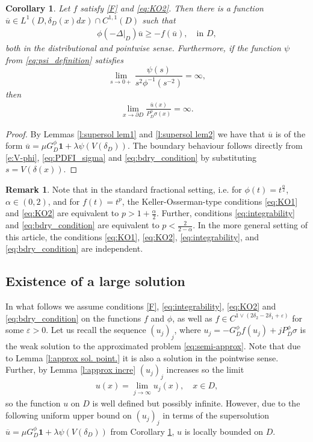 \documentclass[12pt,a4paper,onecolumn]{amsart}
\newtheorem{cor}[thm]{Corollary}
\theoremstyle{definition}
\newtheorem{rem}[thm]{Remark}
\newcommand{\1}{\mathbf 1}
\newcommand{\LLL}{L^1(D,\de(x)dx)}
\newcommand{\Lo}{\phi(-\left.\Delta\right\vert_{D})}
\newcommand{\GDfi}{G^\phi_{ D}}
\newcommand{\GDFI}{\GDfi}
\newcommand{\PDfi}{P^\phi_{ D}}
\newcommand{\PDFI}{\PDfi}
\newcommand{\de}{\delta_D}
\numberwithin{equation}{section}
\begin{document}
\begin{cor}\label{c:large supersolution}
	Let $f$ satisfy \ref{F} and \eqref{eq:KO2}. Then there is a function $\overline u\in \LLL \cap C^{1,1}(D)$ such that 
	\begin{align*}
		\Lo\overline u\ge -f(\overline u),\quad \text{in $D$},
	\end{align*}
	both in the distributional and pointwise sense. Furthermore, if the function $\psi$ from \eqref{eq:psi_definition} satisfies
 \begin{equation}\label{eq:bdry_condition}
 \lim_{s\to 0+}\frac{\psi(s)}{s^2\phi^{-1}(s^{-2})}=\infty,
 \end{equation}
  then 
	\begin{align*}
		\lim_{x\to \partial D}\frac{\overline u(x)}{\PDFI\sigma(x)}=\infty.
	\end{align*}
\end{cor}
\begin{proof}
    By Lemmas \ref{l:supersol lem1} and \ref{l:supersol lem2} we have that $\overline u$ is of the form $\overline u=\mu \GDFI\1+\lambda \psi(V(\de))$.
    The boundary behaviour follows directly from  \eqref{e:V-phi}, \eqref{eq:PDFI_sigma} and \eqref{eq:bdry_condition} by substituting $s=V(\delta(x))$.  
\end{proof}
\begin{rem}
 Note that in the standard fractional setting, i.e. for $\phi(t)=t^{\frac \alpha 2}$, $\alpha\in(0,2)$, and for $f(t)=t^p$, the Keller-Osserman-type conditions \eqref{eq:KO1} and \eqref{eq:KO2} are equivalent to $p>1+\tfrac \alpha 2$. Further, conditions \eqref{eq:integrability} and \eqref{eq:bdry_condition} are equivalent to $p<\tfrac 2{2-\alpha}$. In the more general setting of this article, the conditions \eqref{eq:KO1}, \eqref{eq:KO2}, \eqref{eq:integrability}, and \eqref{eq:bdry_condition} are independent.
\end{rem}


\subsection{Existence of a large solution}\label{ss:existence}
 In what follows we assume conditions \ref{F}, \eqref{eq:integrability}, \eqref{eq:KO2} and \eqref{eq:bdry_condition} on the functions $f$ and $\phi$, as well as $f\in C^{1 \vee (2\delta_2-2\delta_1+\varepsilon)}$ for some $\varepsilon>0$. Let us recall the sequence $(u_j)_j$, where $u_j=-\GDFI f(u_j)+j\PDFI\sigma$ is the weak solution to the approximated problem \eqref{eq:semi-approx}. Note that due to Lemma \ref{l:approx sol. point.} it is also a solution in the pointwise sense. Further, by Lemma \ref{l:approx incre} $(u_j)_j$ increases so the limit
\begin{align}\label{eq:large solution}
	u(x)=\lim_{j\to\infty} u_j(x),\quad x\in D,
\end{align}
so the function $u$ on $D$ is well defined but possibly infinite. However, due to the following uniform upper bound on $(u_j)_j$ in terms of the supersolution $\overline u=\mu \GDFI\1+\lambda \psi(V(\de))$ from Corollary \ref{c:large supersolution}, $u$ is locally bounded on $D$.
\end{document}
